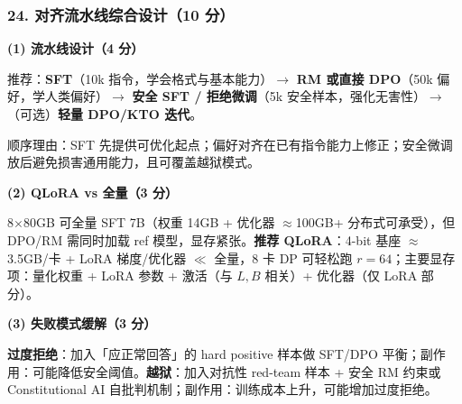 \documentclass[11pt,a4paper]{article}
\begin{document}
\subsubsection*{24. 对齐流水线综合设计（10 分）}

\noindent\textbf{(1) 流水线设计（4 分）}

推荐：\textbf{SFT}（10k 指令，学会格式与基本能力）$\to$ \textbf{RM 或直接 DPO}（50k 偏好，学人类偏好）$\to$ \textbf{安全 SFT / 拒绝微调}（5k 安全样本，强化无害性）$\to$（可选）\textbf{轻量 DPO/KTO 迭代}。

顺序理由：SFT 先提供可优化起点；偏好对齐在已有指令能力上修正；安全微调放后避免损害通用能力，且可覆盖越狱模式。

\noindent\textbf{(2) QLoRA vs 全量（3 分）}

8$\times$80GB 可全量 SFT 7B（权重 14GB + 优化器 $\approx$100GB+ 分布式可承受），但 DPO/RM 需同时加载 ref 模型，显存紧张。\textbf{推荐 QLoRA}：4-bit 基座 $\approx$3.5GB/卡 + LoRA 梯度/优化器 $\ll$ 全量，8 卡 DP 可轻松跑 $r=64$；主要显存项：量化权重 + LoRA 参数 + 激活（与 $L,B$ 相关）+ 优化器（仅 LoRA 部分）。

\noindent\textbf{(3) 失败模式缓解（3 分）}

\textbf{过度拒绝}：加入「应正常回答」的 hard positive 样本做 SFT/DPO 平衡；副作用：可能降低安全阈值。\textbf{越狱}：加入对抗性 red-team 样本 + 安全 RM 约束或 Constitutional AI 自批判机制；副作用：训练成本上升，可能增加过度拒绝。
\end{document}
